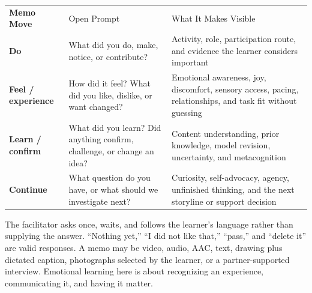 \begin{tabularx}{\textwidth}{
>{\bfseries\RaggedRight\arraybackslash}p{0.75in}
>{\RaggedRight\arraybackslash}p{2.20in}
>{\RaggedRight\arraybackslash}X}

\rowcolor{PrimaryRed}
\color{white}Memo Move &
\color{white}Open Prompt &
\color{white}What It Makes Visible \\

Do &
What did you do, make, notice, or contribute? &
Activity, role, participation route, and evidence the learner considers important \\

\rowcolor{SoftGray}
Feel / experience &
How did it feel? What did you like, dislike, or want changed? &
Emotional awareness, joy, discomfort, sensory access, pacing, relationships, and task fit without guessing \\

Learn / confirm &
What did you learn? Did anything confirm, challenge, or change an idea? &
Content understanding, prior knowledge, model revision, uncertainty, and metacognition \\

\rowcolor{SoftGray}
Continue &
What question do you have, or what should we investigate next? &
Curiosity, self-advocacy, agency, unfinished thinking, and the next storyline or support decision \\

\end{tabularx}

\normalsize

The facilitator asks once, waits, and follows the learner's language rather than supplying the answer. ``Nothing yet,'' ``I did not like that,'' ``pass,'' and ``delete it'' are valid responses. A memo may be video, audio, AAC, text, drawing plus dictated caption, photographs selected by the learner, or a partner-supported interview. Emotional learning here is about recognizing an experience, communicating it, and having it matter.

